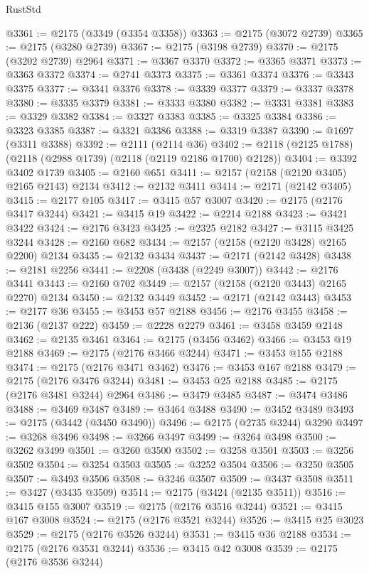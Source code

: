\begin{lexlean}{RustStd}
\begin{coremodule}
@3361 := @2175 (@3349 (@3354 @3358))
@3363 := @2175 (@3072 @2739)
@3365 := @2175 (@3280 @2739)
@3367 := @2175 (@3198 @2739)
@3370 := @2175 (@3202 @2739) @2964
@3371 := @3367 @3370
@3372 := @3365 @3371
@3373 := @3363 @3372
@3374 := @2741 @3373
@3375 := @3361 @3374
@3376 := @3343 @3375
@3377 := @3341 @3376
@3378 := @3339 @3377
@3379 := @3337 @3378
@3380 := @3335 @3379
@3381 := @3333 @3380
@3382 := @3331 @3381
@3383 := @3329 @3382
@3384 := @3327 @3383
@3385 := @3325 @3384
@3386 := @3323 @3385
@3387 := @3321 @3386
@3388 := @3319 @3387
@3390 := @1697 (@3311 @3388)
@3392 := @2111 (@2114 @36)
@3402 := @2118 (@2125 @1788) (@2118 (@2988 @1739) (@2118 (@2119 @2186 @1700) @2128))
@3404 := @3392 @3402 @1739
@3405 := @2160 @651
@3411 := @2157 (@2158 (@2120 @3405) @2165 @2143) @2134
@3412 := @2132 @3411
@3414 := @2171 (@2142 @3405)
@3415 := @2177 @105
@3417 := @3415 @57 @3007
@3420 := @2175 (@2176 @3417 @3244)
@3421 := @3415 @19
@3422 := @2214 @2188
@3423 := @3421 @3422
@3424 := @2176 @3423
@3425 := @2325 @2182
@3427 := @3115 @3425 @3244
@3428 := @2160 @682
@3434 := @2157 (@2158 (@2120 @3428) @2165 @2200) @2134
@3435 := @2132 @3434
@3437 := @2171 (@2142 @3428)
@3438 := @2181 @2256
@3441 := @2208 (@3438 (@2249 @3007))
@3442 := @2176 @3441
@3443 := @2160 @702
@3449 := @2157 (@2158 (@2120 @3443) @2165 @2270) @2134
@3450 := @2132 @3449
@3452 := @2171 (@2142 @3443)
@3453 := @2177 @36
@3455 := @3453 @57 @2188
@3456 := @2176 @3455
@3458 := @2136 (@2137 @222)
@3459 := @2228 @2279
@3461 := @3458 @3459 @2148
@3462 := @2135 @3461
@3464 := @2175 (@3456 @3462)
@3466 := @3453 @19 @2188
@3469 := @2175 (@2176 @3466 @3244)
@3471 := @3453 @155 @2188
@3474 := @2175 (@2176 @3471 @3462)
@3476 := @3453 @167 @2188
@3479 := @2175 (@2176 @3476 @3244)
@3481 := @3453 @25 @2188
@3485 := @2175 (@2176 @3481 @3244) @2964
@3486 := @3479 @3485
@3487 := @3474 @3486
@3488 := @3469 @3487
@3489 := @3464 @3488
@3490 := @3452 @3489
@3493 := @2175 (@3442 (@3450 @3490))
@3496 := @2175 (@2735 @3244) @3290
@3497 := @3268 @3496
@3498 := @3266 @3497
@3499 := @3264 @3498
@3500 := @3262 @3499
@3501 := @3260 @3500
@3502 := @3258 @3501
@3503 := @3256 @3502
@3504 := @3254 @3503
@3505 := @3252 @3504
@3506 := @3250 @3505
@3507 := @3493 @3506
@3508 := @3246 @3507
@3509 := @3437 @3508
@3511 := @3427 (@3435 @3509)
@3514 := @2175 (@3424 (@2135 @3511))
@3516 := @3415 @155 @3007
@3519 := @2175 (@2176 @3516 @3244)
@3521 := @3415 @167 @3008
@3524 := @2175 (@2176 @3521 @3244)
@3526 := @3415 @25 @3023
@3529 := @2175 (@2176 @3526 @3244)
@3531 := @3415 @36 @2188
@3534 := @2175 (@2176 @3531 @3244)
@3536 := @3415 @42 @3008
@3539 := @2175 (@2176 @3536 @3244)

\end{coremodule}
\end{lexlean}
